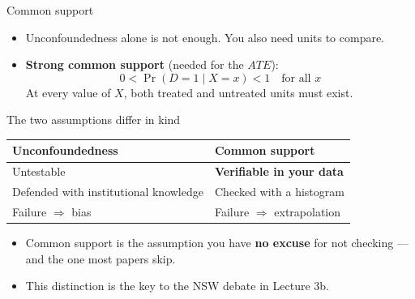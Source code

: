 \documentclass[
  11pt,
  ignorenonframetext,
  aspectratio=169,
]{beamer}
\providecommand{\tightlist}{%
  \setlength{\itemsep}{0pt}\setlength{\parskip}{0pt}}
\begin{document}
\begin{frame}{Common support}
\protect{}\label{common-support}
\begin{itemize}
\tightlist
\item
  Unconfoundedness alone is not enough. You also need units to compare.
\item
  \textbf{Strong common support} (needed for the \(ATE\)): \[
  0 < \Pr(D=1 \mid X = x) < 1 \quad \text{for all } x
  \] At every value of \(X\), both treated and untreated units must
  exist.
\end{itemize}
\end{frame}

\begin{frame}{The two assumptions differ in kind}
\protect{}\label{the-two-assumptions-differ-in-kind}
\begin{center}
\begin{tabular}{ll}
\toprule
\textbf{Unconfoundedness} & \textbf{Common support} \\
\midrule
Untestable & \textbf{Verifiable in your data} \\
Defended with institutional knowledge & Checked with a histogram \\
Failure $\Rightarrow$ bias & Failure $\Rightarrow$ extrapolation \\
\bottomrule
\end{tabular}
\end{center}

\vspace{0.4em}

\begin{itemize}
\tightlist
\item
  Common support is the assumption you have \textbf{no excuse} for not
  checking --- and the one most papers skip.
\item
  This distinction is the key to the NSW debate in Lecture 3b.
\end{itemize}
\end{frame}
\end{document}
